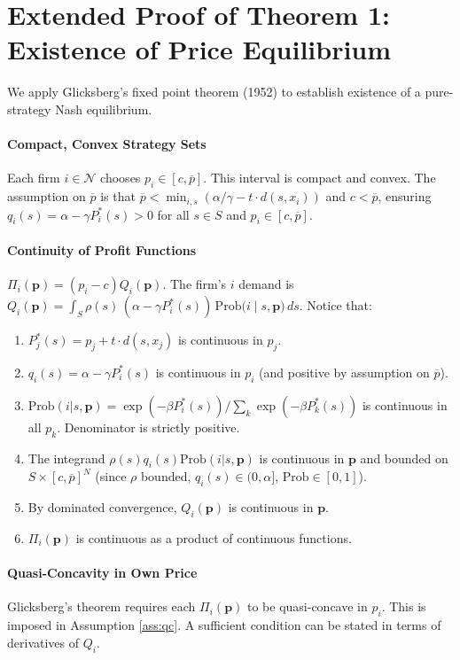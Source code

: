 \documentclass{article}
\begin{document}
\section{Extended Proof of Theorem 1: Existence of Price Equilibrium}
\label{app:existence_proof}

We apply Glicksberg's fixed point theorem (1952) to establish existence of a pure-strategy Nash equilibrium.

\paragraph{Compact, Convex Strategy Sets}
Each firm $i \in \mathcal{N}$ chooses $p_i \in [c, \overline{p}]$. This interval is compact and convex. The assumption on $\overline{p}$ is that $\overline{p} < \min_{i,s} (\alpha/\gamma - t \cdot d(s,x_i))$ and $c < \overline{p}$, ensuring $q_i(s) = \alpha - \gamma P_i^*(s) > 0$ for all $s \in S$ and $p_i \in [c, \overline{p}]$.

\paragraph{Continuity of Profit Functions}
$\Pi_i(\mathbf{p}) = (p_i - c)Q_i(\mathbf{p})$. The firm's $i$ demand is $Q_i(\mathbf{p}) = \int_S \rho(s)\,(\alpha - \gamma P_i^*(s))\,\mathrm{Prob}\bigl(i\mid s,\mathbf{p}\bigr)\,ds$. Notice that:
\begin{enumerate}
  \item $P_j^*(s) = p_j + t \cdot d(s,x_j)$ is continuous in $p_j$.
  \item $q_i(s) = \alpha - \gamma P_i^*(s)$ is continuous in $p_i$ (and positive by assumption on $\overline{p}$).
  \item $\mathrm{Prob}(i|s,\mathbf{p}) = \exp(-\beta P_i^*(s)) / \sum_k \exp(-\beta P_k^*(s))$ is continuous in all $p_k$. Denominator is strictly positive.
  \item The integrand $\rho(s)q_i(s)\mathrm{Prob}(i|s,\mathbf{p})$ is continuous in $\mathbf{p}$ and bounded on $S \times [c,\overline{p}]^N$ (since $\rho$ bounded, $q_i(s) \in (0, \alpha]$, $\mathrm{Prob} \in [0,1]$).
  \item By dominated convergence, $Q_i(\mathbf{p})$ is continuous in $\mathbf{p}$.
  \item $\Pi_i(\mathbf{p})$ is continuous as a product of continuous functions.
\end{enumerate}

\paragraph{Quasi-Concavity in Own Price}
Glicksberg's theorem requires each $\Pi_i(\mathbf{p})$ to be quasi-concave in $p_i$. This is imposed in Assumption
\ref{ass:qc}. A sufficient condition can be stated in terms of derivatives of $Q_i$.
\end{document}
